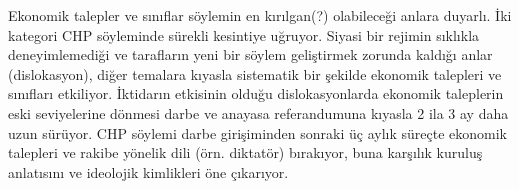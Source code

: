\begin{bulgu}{Ekonomik talepler ve sınıflar söylemin en kırılgan(?) olabileceği anlara duyarlı. İki kategori CHP
  söyleminde sürekli kesintiye uğruyor.} 
Siyasi bir rejimin sıklıkla deneyimlemediği ve tarafların yeni bir söylem geliştirmek zorunda
kaldığı anlar (dislokasyon), diğer temalara kıyasla sistematik bir şekilde ekonomik talepleri ve sınıfları etkiliyor.
İktidarın etkisinin olduğu dislokasyonlarda ekonomik taleplerin eski seviyelerine dönmesi darbe ve anayasa
referandumuna kıyasla 2 ila 3 ay daha uzun sürüyor. CHP söylemi darbe girişiminden sonraki üç aylık süreçte ekonomik talepleri ve rakibe yönelik dili (örn. diktatör) bırakıyor, buna karşılık kuruluş anlatısını ve ideolojik kimlikleri öne çıkarıyor. 




\end{bulgu}
